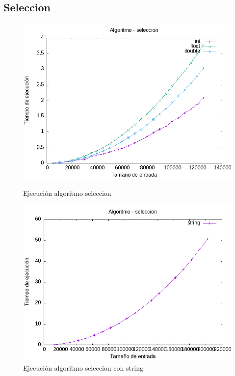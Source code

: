 \documentclass[11pt]{article}
\begin{document}
\subsection{Seleccion}
\begin{figure}[H]
    \begin{minipage}{0.5\textwidth}
        \centering
        \includegraphics[width=\linewidth]{assets/Img/seleccion.png}
        \caption{Ejecución algoritmo seleccion}
        \label{fig:seleccion}
    \end{minipage}%
    \begin{minipage}{0.5\textwidth}
        \centering
        \includegraphics[width=\linewidth]{assets/Img/seleccionstring.png}
        \caption{Ejecución algoritmo seleccion con string}
        \label{fig:seleccionstring}
    \end{minipage}
\end{figure}
\end{document}
